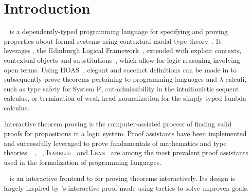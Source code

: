 \chapter{Introduction}





\Beluga~\cite{pientka2010beluga} is a dependently-typed programming language for specifying and proving properties about formal systems using contextual modal type theory~\cite{nanevski2008contextual}.
It leverages \LF, the Edinburgh Logical Framework~\cite{harper1993framework}, extended with explicit contexts, contextual objects and substitutions~\cite{DBLP:journals/corr/abs-1009-2789, cave2013first}, which allow for logic reasoning involving open terms.
Using \ac{HOAS}~\cite{pfenning1988higher}, elegant and succinct definitions can be made in \LF to subsequently prove theorems pertaining to programming languages and $ \lambda $-calculi, such as type safety for System F, cut-admissibility in the intuitionistic sequent calculus, or termination of weak-head normalization for the simply-typed lambda calculus.


Interactive theorem proving is the computer-assisted process of finding valid proofs for propositions in a logic system.
Proof assistants have been implemented and successfully leveraged to prove fundamentals of mathematics and type theories.
\Agda~\cite{clffolp}, \Coq~\cite{Coq, bertot2013interactive}, \textsc{Isabelle}~\cite{nipkow2002isabelle} and \textsc{Lean}~\cite{lean4} are among the most prevalent proof assistants used in the formalization of programming languages.

\Harpoon~\cite{errington2021harpoon} is an interactive frontend to \Beluga for proving theorems interactively.
Its design is largely inspired by \Coq's interactive proof mode using tactics to solve unproven goals.

